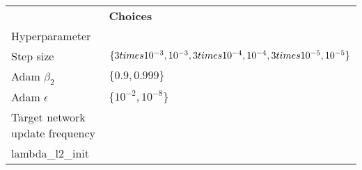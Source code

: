 \begin{tabular}{ll}
 & \bfseries Choices \\
Hyperparameter &  \\
Step size & $\{3 \\times 10^{-3}, 10^{-3}, 3 \\times 10^{-4}, 10^{-4}, 3 \\times 10^{-5}, 10^{-5}\}$ \\
Adam $\beta_2$ & $\{0.9, 0.999\}$ \\
Adam $\epsilon$ & $\{10^{-2}, 10^{-8}\}$ \\
Target network update frequency &  \\
lambda_l2_init &  \\
\end{tabular}
